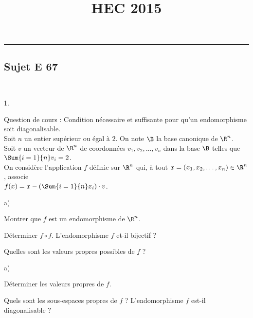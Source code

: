 \documentclass[11pt]{article}%
\title{\bf \vspace{-1.6cm} HEC 2015} %
\author{} %
\date{} %
\begin{document}
\maketitle %
\vspace{-1.2cm}\hrule %
\thispagestyle{fancy}

\vspace*{.2cm}


\subsection*{Sujet E 67}


\begin{exerciceAP}~
  \begin{noliste}{1.}
    \setlength{\itemsep}{2mm}
  \item Question de cours : Condition nécessaire et suffisante pour
    qu'un endomorphisme soit diagonalisable.\\
    Soit $n$ un entier supérieur ou égal à $2$. On note $\B$ la base
    canonique de $\R^n$.\\
    Soit $v$ un vecteur de $\R^n$ de coordonnées $v_1,v_2,\hdots,v_n$
    dans la base $\B$ telles que $\Sum{i=1}{n} v_i=2$.\\
    On considère l'application $f$ définie sur $\R^n$ qui, à tout
    $x=(x_1,x_2,\hdots,x_n)\in\R^n$, associe\\
    $f(x)=x-\left(\Sum{i=1}{n} x_i\right) \cdot v$.

  \item
    \begin{noliste}{a)}
    \setlength{\itemsep}{2mm}
    \item Montrer que $f$ est un endomorphisme de $\R^n$.
    \item Déterminer $f \circ f$. L'endomorphisme $f$ et-il bijectif ?
    \item Quelles sont les valeurs propres possibles de $f$ ?
    \end{noliste}

  \item
    \begin{noliste}{a)}
    \setlength{\itemsep}{2mm}
    \item Déterminer les valeurs propres de $f$.
    \item Quels sont les sous-espaces propres de $f$ ? L'endomorphisme
      $f$ est-il diagonalisable ?
    \end{noliste}


\end{noliste}
\end{exerciceAP}
\end{document}
